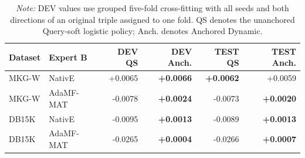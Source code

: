 \begin{table}[t]
\centering
\small
\caption{DEV cross-fit and locked TEST deltas relative to Global alpha.}
\label{tab:anchored_dynamic_dev_test_stability}
\setlength{\tabcolsep}{4pt}
\begin{tabular}{llrrrr}
\toprule
Dataset & Expert B & DEV QS & DEV Anch. & TEST QS & TEST Anch. \\
\midrule
MKG-W & NativE & +0.0065 & \textbf{+0.0066} & \textbf{+0.0062} & +0.0059 \\
MKG-W & AdaMF-MAT & -0.0078 & \textbf{+0.0024} & -0.0073 & \textbf{+0.0020} \\
DB15K & NativE & -0.0095 & \textbf{+0.0013} & -0.0089 & \textbf{+0.0013} \\
DB15K & AdaMF-MAT & -0.0265 & \textbf{+0.0004} & -0.0266 & \textbf{+0.0007} \\
\bottomrule
\end{tabular}
\vspace{0.4ex}
\caption*{\footnotesize \textit{Note:} DEV values use grouped five-fold cross-fitting with all seeds and both directions of an original triple assigned to one fold. QS denotes the unanchored Query-soft logistic policy; Anch. denotes Anchored Dynamic.}
\end{table}
